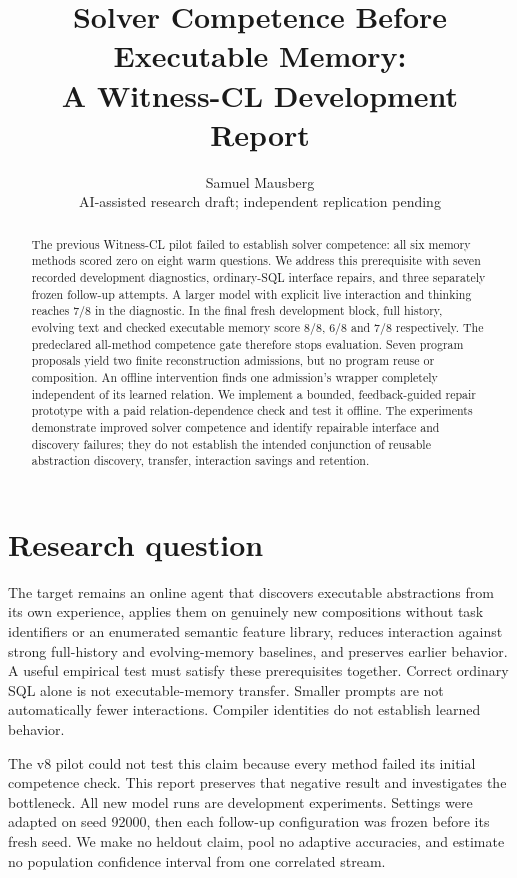 \documentclass[10pt,twocolumn]{article}
\title{\vspace{-1.2em}\textbf{Solver Competence Before Executable Memory:\\A Witness-CL Development Report}}
\author{Samuel Mausberg\\\small AI-assisted research draft; independent replication pending}
\date{}
\begin{document}
\raggedbottom\maketitle
\begin{abstract}
The previous Witness-CL pilot failed to establish solver competence: all six
memory methods scored zero on eight warm questions. We address this prerequisite
with seven recorded development diagnostics, ordinary-SQL interface repairs,
and three separately frozen follow-up attempts. A larger model with explicit
live interaction and thinking reaches 7/8 in the diagnostic. In the final fresh
development block, full history, evolving text and checked executable memory
score 8/8, 6/8 and 7/8 respectively. The predeclared all-method competence gate
therefore stops evaluation. Seven program proposals yield two finite
reconstruction admissions, but no program reuse or composition. An offline
intervention finds one admission's wrapper completely independent of its learned
relation. We implement a bounded, feedback-guided repair prototype with a paid
relation-dependence check and test it offline. The experiments demonstrate
improved solver competence and identify repairable interface and discovery
failures; they do not establish the intended conjunction of reusable abstraction
discovery, transfer, interaction savings and retention.
\end{abstract}

\section{Research question}
The target remains an online agent that discovers executable abstractions from
its own experience, applies them on genuinely new compositions without task
identifiers or an enumerated semantic feature library, reduces interaction
against strong full-history and evolving-memory baselines, and preserves earlier
behavior. A useful empirical test must satisfy these prerequisites together.
Correct ordinary SQL alone is not executable-memory transfer. Smaller prompts
are not automatically fewer interactions. Compiler identities do not establish
learned behavior.

The v8 pilot could not test this claim because every method failed its initial
competence check. This report preserves that negative result and investigates
the bottleneck. All new model runs are development experiments. Settings were
adapted on seed 92000, then each follow-up configuration was frozen before its
fresh seed. We make no heldout claim, pool no adaptive accuracies, and estimate
no population confidence interval from one correlated stream.
\end{document}
